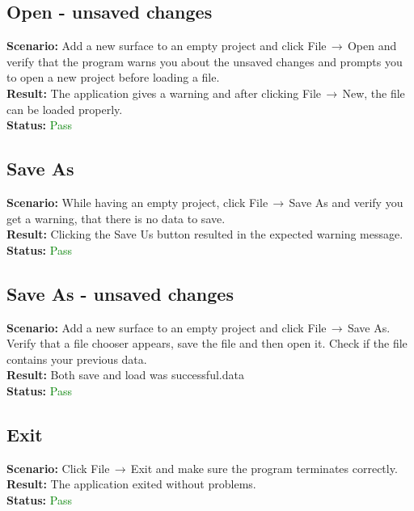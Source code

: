 \documentclass[a4paper, 11pt, article]{report}
\begin{document}
\subsection{Open - unsaved changes}

\noindent \textbf{Scenario:} Add a new surface to an empty project and click File$\,\to\,$Open and verify that the program warns you about the unsaved changes and prompts you to open a new project before loading a file.
\\
\noindent \textbf{Result:} The application gives a warning and after clicking File$\,\to\,$New, the file can be loaded properly.
\\
\noindent \textbf{Status:} \textcolor{green}{Pass}

\subsection{Save As}

\noindent \textbf{Scenario:} While having an empty project, click File$\,\to\,$Save As and verify you get a warning, that there is no data to save.
\\
\noindent \textbf{Result:} Clicking the Save Us button resulted in the expected warning message.
\\
\noindent \textbf{Status:} \textcolor{green}{Pass}

\subsection{Save As - unsaved changes}

\noindent \textbf{Scenario:} Add a new surface to an empty project and click File$\,\to\,$Save As. Verify that a file chooser appears, save the file and then open it. Check if the file contains your previous data.
\\
\noindent \textbf{Result:} Both save and load was successful.data
\\
\noindent \textbf{Status:} \textcolor{green}{Pass}

\subsection{Exit}

\noindent \textbf{Scenario:} Click File$\,\to\,$Exit and make sure the program terminates correctly.
\\
\noindent \textbf{Result:} The application exited without problems.
\\
\noindent \textbf{Status:} \textcolor{green}{Pass}
\end{document}
